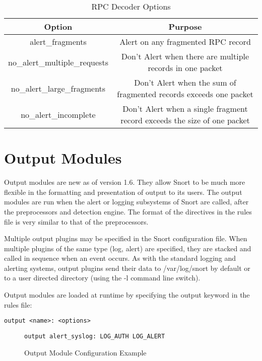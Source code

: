 \documentclass[english]{report}
\begin{document}
%
\begin{table}[!hbpt]

\caption{RPC Decoder Options\label{rpc options}}

\begin{center}\begin{tabular}{|c|c|}
\hline 
Option&
Purpose\\
\hline
\hline 
alert\_fragments&
Alert on any fragmented RPC record\\
\hline 
no\_alert\_multiple\_requests&
Don't Alert when there are multiple records in one packet\\
\hline 
no\_alert\_large\_fragments&
Don't Alert when the sum of fragmented records exceeds one packet\\
\hline 
no\_alert\_incomplete&
Don't Alert when a single fragment record exceeds the size of one
packet\\
\hline
\end{tabular}\end{center}
\end{table}

\section{Output Modules}

Output modules are new as of version 1.6. They allow Snort to be much
more flexible in the formatting and presentation of output to its
users. The output modules are run when the alert or logging subsystems
of Snort are called, after the preprocessors and detection engine.
The format of the directives in the rules file is very similar to
that of the preprocessors.

Multiple output plugins may be specified in the Snort configuration
file. When multiple plugins of the same type (log, alert) are specified,
they are stacked and called in sequence when an
event occurs. As with the standard logging and alerting systems, output
plugins send their data to /var/log/snort by default or to a user
directed directory (using the -l command line
switch).

Output modules are loaded at runtime by specifying the output keyword
in the rules file:

\begin{verbatim}
output <name>: <options>
\end{verbatim}
%
\begin{figure}[!hbpt]
\begin{verbatim}
output alert_syslog: LOG_AUTH LOG_ALERT
\end{verbatim}

\caption{\label{output config example}Output Module Configuration Example}
\end{figure}
\end{document}
